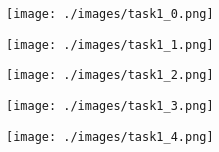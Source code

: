 \begin{figure}[!ht]
    \centering
    \texttt{[image: ./images/task1\_0.png]}
\end{figure}

\begin{figure}[!ht]
    \centering
    \texttt{[image: ./images/task1\_1.png]}
\end{figure}

\begin{figure}[!ht]
    \centering
    \texttt{[image: ./images/task1\_2.png]}
\end{figure}

\begin{figure}[!ht]
    \centering
    \texttt{[image: ./images/task1\_3.png]}
\end{figure}

\begin{figure}[!ht]
    \centering
    \texttt{[image: ./images/task1\_4.png]}
\end{figure}
